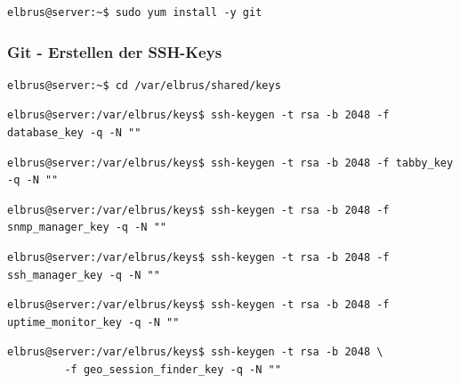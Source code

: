 \documentclass{article}
\begin{document}
	\lstset{style=commands}
	\begin{lstlisting}[caption={Installieren von dem VCS 'git'.}]
		elbrus@server:~$ sudo yum install -y git
	\end{lstlisting}
	
	\lstset{style=commands}
	\subsubsection{Git - Erstellen der SSH-Keys}
	\begin{lstlisting}[caption={Wechseln des Verzeichnisses.}]
		elbrus@server:~$ cd /var/elbrus/shared/keys
	\end{lstlisting}
	
	\lstset{style=commands}
	\begin{lstlisting}[caption={Erstellen des SSH-keys der für das Herunterladen der 'Database' benötigt wird.}]
		elbrus@server:/var/elbrus/keys$ ssh-keygen -t rsa -b 2048 -f database_key -q -N ""
	\end{lstlisting}

	\lstset{style=commands}
	\begin{lstlisting}[caption={Erstellen des SSH-Keys der für das Herunterladen der Kernsoftware 'tabby' benötigt wird.}]
		elbrus@server:/var/elbrus/keys$ ssh-keygen -t rsa -b 2048 -f tabby_key -q -N ""
	\end{lstlisting}

	\lstset{style=commands}
	\begin{lstlisting}[caption={Erstellen des SSH-keys der für das Herunterladen des 'SNMP-Managers' benötigt wird.}]
		elbrus@server:/var/elbrus/keys$ ssh-keygen -t rsa -b 2048 -f snmp_manager_key -q -N ""
	\end{lstlisting}

	\lstset{style=commands}
	\begin{lstlisting}[caption={Erstellen des SSH-keys der für das Herunterladen des 'SSH-Managers' benötigt wird.}]
		elbrus@server:/var/elbrus/keys$ ssh-keygen -t rsa -b 2048 -f ssh_manager_key -q -N ""
	\end{lstlisting}
	
	\lstset{style=commands}
	\begin{lstlisting}[caption={Erstellen des SSH-keys der für das Herunterladen des 'Uptime-Monitors' benötigt wird.}]
		elbrus@server:/var/elbrus/keys$ ssh-keygen -t rsa -b 2048 -f uptime_monitor_key -q -N ""
	\end{lstlisting}
	
	\lstset{style=commands}
	\begin{lstlisting}[caption={Erstellen des SSH-keys der für das Herunterladen des 'geo session finders' benötigt wird.}]
		elbrus@server:/var/elbrus/keys$ ssh-keygen -t rsa -b 2048 \
		 -f geo_session_finder_key -q -N ""
	\end{lstlisting}
\end{document}
